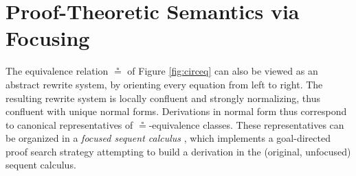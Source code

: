 \documentclass[copyright,creativecommons]{eptcs}
\theoremstyle{definition}
\newcommand{\FSkMCC}{\mathsf{Free}}
\begin{document}

\section{Proof-Theoretic Semantics via Focusing}
\label{sec:focus}
The equivalence relation $\circeq$ of Figure \ref{fig:circeq} can also be viewed as an abstract rewrite system, by orienting every equation from left to right. The resulting rewrite system is locally confluent and strongly normalizing, thus confluent with unique normal forms. Derivations in normal form thus correspond to canonical representatives of $\circeq$-equivalence classes.
These representatives can be organized in a \emph{focused sequent calculus} \cite{andreoli:logic:1992}, which implements a goal-directed proof search strategy attempting to build a derivation in the (original, unfocused) sequent calculus.
\end{document}
